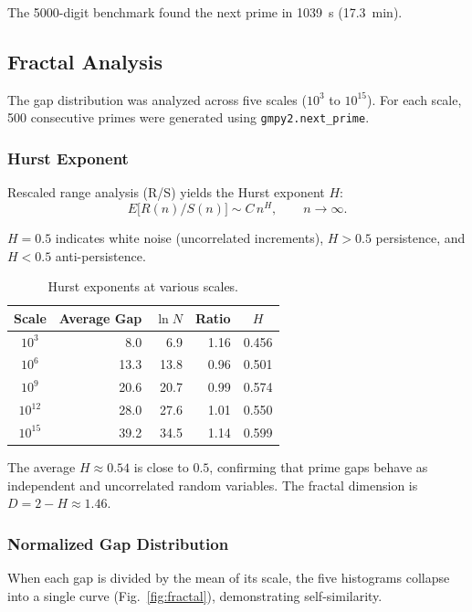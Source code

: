 \documentclass[12pt,a4paper]{article}
\theoremstyle{plain}
\begin{document}
The 5000-digit benchmark found the next prime in 1039~s (17.3~min).

\subsection{Fractal Analysis}
\label{sec:fractal}

The gap distribution was analyzed across five scales ($10^3$ to
$10^{15}$). For each scale, 500 consecutive primes were generated
using {\tt gmpy2.next\_prime}.

\subsubsection{Hurst Exponent}

Rescaled range analysis (R/S) yields the Hurst exponent $H$:
\[
E\bigl[R(n)/S(n)\bigr] \sim C\,n^H,\qquad n\to\infty.
\]

$H=0.5$ indicates white noise (uncorrelated increments), $H>0.5$
persistence, and $H<0.5$ anti-persistence.

\begin{table}[htbp]
\centering
\caption{Hurst exponents at various scales.}
\label{tab:hurst}
\begin{tabular}{crrrc}
\hline
Scale & Average Gap & $\ln N$ & Ratio & $H$ \\
\hline
$10^3$ & 8.0 & 6.9 & 1.16 & 0.456 \\
$10^6$ & 13.3 & 13.8 & 0.96 & 0.501 \\
$10^9$ & 20.6 & 20.7 & 0.99 & 0.574 \\
$10^{12}$ & 28.0 & 27.6 & 1.01 & 0.550 \\
$10^{15}$ & 39.2 & 34.5 & 1.14 & 0.599 \\
\hline
\end{tabular}
\end{table}

The average $H\approx0.54$ is close to $0.5$, confirming that prime gaps
behave as independent and uncorrelated random variables. The fractal
dimension is $D=2-H\approx1.46$.

\subsubsection{Normalized Gap Distribution}

When each gap is divided by the mean of its scale, the five histograms
collapse into a single curve (Fig.~\ref{fig:fractal}), demonstrating
self-similarity.
\end{document}
